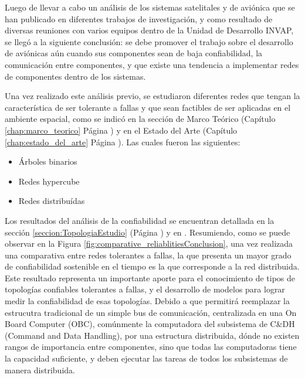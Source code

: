Luego de llevar a cabo un análisis de los sistemas satelitales y de aviónica que se
han publicado en diferentes trabajos de investigación, y como resultado de  diversas reuniones
con varios equipos dentro de la Unidad de Desarrollo INVAP, se llegó a la siguiente conclusión:
se debe promover el trabajo sobre el desarrollo de aviónicas aún cuando sus componentes
sean de baja confiabilidad, la comunicación entre componentes,
y que existe una tendencia a implementar redes de componentes dentro de los sistemas.

Una vez realizado este análisis previo, se estudiaron diferentes redes que tengan
la característica de ser tolerante a fallas y que sean factibles de ser
aplicadas en el ambiente espacial, como se indicó en la sección de Marco
Teórico (Capítulo \ref{chap:marco_teorico} Página \pageref{chap:marco_teorico}) y en
el Estado del Arte (Capítulo \ref{chap:estado_del_arte} Página \pageref{chap:estado_del_arte}).
Las cuales fueron las siguientes:
\begin{itemize}
\item Árboles binarios
\item Redes hypercube
\item Redes distribuídas
\end{itemize}

Los resultados del análisis de la confiabilidad se encuentran detallada en la sección
\ref{seccion:TopologiaEstudio} (Página \pageref{seccion:TopologiaEstudio}) y en
\cite{Arias17}. Resumiendo, como se puede observar en la Figura
\ref{fig:comparative_reliablitiesConclusion}, una vez realizada una comparativa
entre redes tolerantes a fallas, la que presenta un mayor grado
de confiabilidad sostenible en el tiempo es la que corresponde a
la red distribuida. Este resultado representa un importante aporte para el
conocimiento de tipos de topologías confiables tolerantes a fallas, y el desarrollo de
modelos para lograr medir la confiabilidad de esas topologías. Debido a que
permitirá reemplazar la estrucutra tradicional de un simple bus de comunicación, centralizada
en una On Board Computer (OBC), comúnmente la computadora del subsistema de C&DH
(Command and Data Handling), por una estructura distribuida, dónde no existen
rangos de importancia entre componentes,  sino que todas las computadoras
tiene la capacidad suficiente, y deben ejecutar las tareas de todos los subsistemas
de manera distribuida. 

\begin{comment}
Los resultados de
este estudio fueron presentados en el \textit{Congreso Argentino de Tecnologías
  Espaciales 2017 (Córdoba, Argentina)}
\end{comment}

